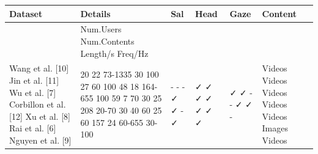 \begin{tabular}{llllll}
\toprule
Dataset & Details & Sal & Head & Gaze & Content \\
\midrule
 & Num.Users Num.Contents Length/s Freq/Hz &  &  &  &  \\
Wang et al. [10] Jin et al. [11] Wu et al. [7] Corbillon et al. [12] Xu et al. [8] Rai et al. [6] Nguyen et al. [9] & 20 22 73-1335 30 100 27 60 100 48 18 164-655 100 59 7 70 30 25 208 20-70 30 40 60 25 60 157 24 60-655 30-100 & - - - ✓ ✓ - ✓ & ✓ ✓ ✓ ✓ ✓ ✓ ✓ & ✓ ✓ - - ✓ ✓ - & Videos Videos Videos Videos Videos Images Videos \\
\bottomrule
\end{tabular}
